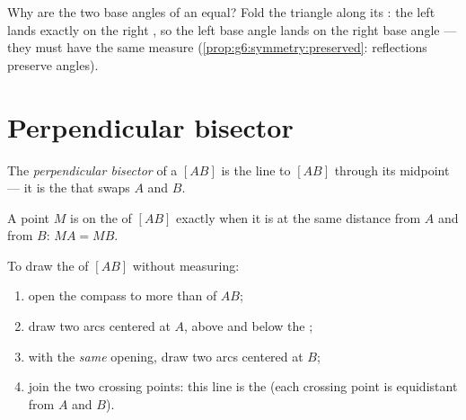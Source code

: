 \begin{example}\label{ex:g6:symmetry:proves}
Why are the two base angles of an  equal? Fold the
triangle along its : the left  lands exactly on the
right , so the left base angle lands on the right base angle ---
they must have the same measure
(\cref{prop:g6:symmetry:preserved}: reflections preserve angles).
\end{example}

\section{Perpendicular bisector}

\begin{definition}\label{def:g6:symmetry:bisector}
The \emph{perpendicular bisector} of a
 $[AB]$ is the line  to $[AB]$ through its
midpoint --- it is the  that swaps $A$ and $B$.
\end{definition}

\begin{proposition}[Equidistance]\label{prop:g6:symmetry:bisector}
A point $M$ is on the  of $[AB]$ exactly when it
is at the same distance from $A$ and from $B$: $MA = MB$.
\end{proposition}
\admitted

\begin{method}\label{met:g6:symmetry:bisector}
To draw the  of $[AB]$ without measuring:
\begin{enumerate}
  \item open the compass to more than  of $AB$;
  \item draw two arcs centered at $A$, above and below the ;
  \item with the \emph{same} opening, draw two arcs centered at $B$;
  \item join the two crossing points: this line is the  (each crossing point is equidistant from $A$ and $B$).
\end{enumerate}
\end{method}

